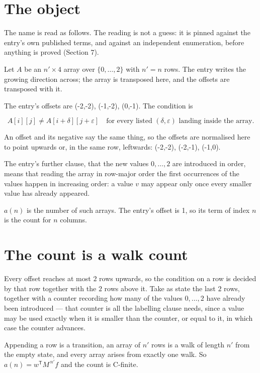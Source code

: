 \documentclass[11pt]{article}
\theoremstyle{definition}
\begin{document}
\section{The object}

The name is read as follows. The reading is not a guess: it is pinned against the entry's own published terms, and against an independent enumeration, before anything is proved (Section 7).

Let $A$ be an $n' \times 4$ array over $\{0,\dots,2\}$ with $n' = n$ rows. The entry writes the growing direction across; the array is transposed here, and the offsets are transposed with it.

The entry's offsets are (-2,-2), (-1,-2), (0,-1). The condition is

\[A[i][j] \ne A[i{+}\delta][j{+}\varepsilon]\quad\text{for every listed }(\delta,\varepsilon)\text{ landing inside the array.}\]

An offset and its negative say the same thing, so the offsets are normalised here to point upwards or, in the same row, leftwards: (-2,-2), (-2,-1), (-1,0).

The entry's further clause, that the new values $0,\dots,2$ are introduced in order, means that reading the array in row-major order the first occurrences of the values happen in increasing order: a value $v$ may appear only once every smaller value has already appeared.

$a(n)$ is the number of such arrays. The entry's offset is 1, so its term of index $n$ is the count for $n$ columns.

\section{The count is a walk count}

Every offset reaches at most $2$ rows upwards, so the condition on a row is decided by that row together with the $2$ rows above it. Take as state the last $2$ rows, together with a counter recording how many of the values $0,\dots,2$ have already been introduced --- that counter is all the labelling clause needs, since a value may be used exactly when it is smaller than the counter, or equal to it, in which case the counter advances.

Appending a row is a transition, an array of $n'$ rows is a walk of length $n'$ from the empty state, and every array arises from exactly one walk. So $a(n) = w^{\mathsf T}M^{\,n'}f$ and the count is C-finite.
\end{document}
